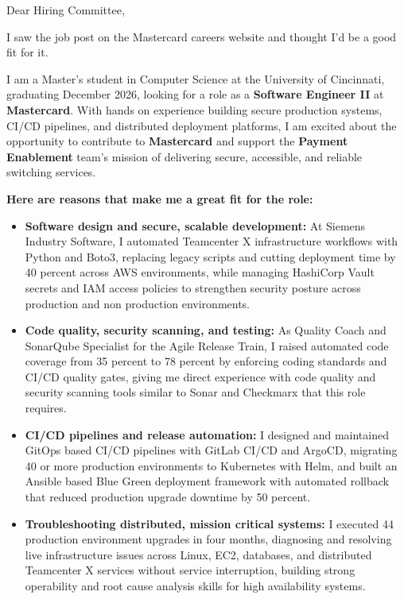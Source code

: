 \documentclass[11pt]{letter}
\date{}
\begin{document}
\begin{letter}{}

\opening{Dear Hiring Committee,}

I saw the job post on the Mastercard careers website and thought I'd be a good fit for it.

I am a Master's student in Computer Science at the University of Cincinnati, graduating December 2026, looking for a role as a \textbf{Software Engineer II} at \textbf{Mastercard}. With hands on experience building secure production systems, CI/CD pipelines, and distributed deployment platforms, I am excited about the opportunity to contribute to \textbf{Mastercard} and support the \textbf{Payment Enablement} team's mission of delivering secure, accessible, and reliable switching services.

\textbf{Here are reasons that make me a great fit for the role:}

\begin{itemize}[leftmargin=*, itemsep=0.45em]
    \item \textbf{Software design and secure, scalable development:} At Siemens Industry Software, I automated Teamcenter X infrastructure workflows with Python and Boto3, replacing legacy scripts and cutting deployment time by 40 percent across AWS environments, while managing HashiCorp Vault secrets and IAM access policies to strengthen security posture across production and non production environments.

    \item \textbf{Code quality, security scanning, and testing:} As Quality Coach and SonarQube Specialist for the Agile Release Train, I raised automated code coverage from 35 percent to 78 percent by enforcing coding standards and CI/CD quality gates, giving me direct experience with code quality and security scanning tools similar to Sonar and Checkmarx that this role requires.

    \item \textbf{CI/CD pipelines and release automation:} I designed and maintained GitOps based CI/CD pipelines with GitLab CI/CD and ArgoCD, migrating 40 or more production environments to Kubernetes with Helm, and built an Ansible based Blue Green deployment framework with automated rollback that reduced production upgrade downtime by 50 percent.

    \item \textbf{Troubleshooting distributed, mission critical systems:} I executed 44 production environment upgrades in four months, diagnosing and resolving live infrastructure issues across Linux, EC2, databases, and distributed Teamcenter X services without service interruption, building strong operability and root cause analysis skills for high availability systems.


\end{itemize}
\end{letter}
\end{document}
